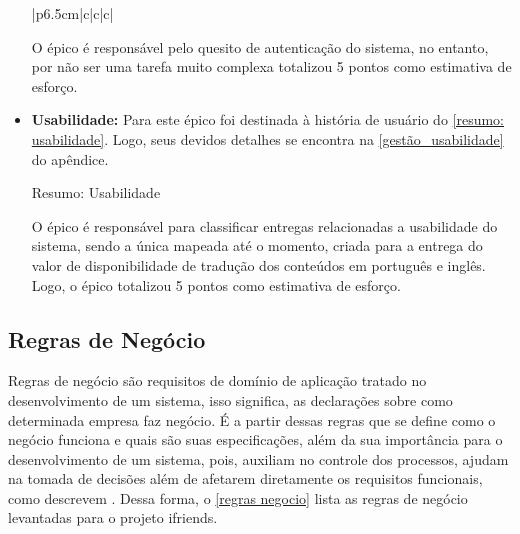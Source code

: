 \begin{itemize}
\begin{quadro}[htb]
{\begin{tabular}{|p{6.5cm}|c|c|c|}
\end{tabular}}
\end{quadro}
\FloatBarrier 

O épico é responsável pelo quesito de autenticação do sistema, no entanto, por não ser uma tarefa muito complexa totalizou 5 pontos como estimativa de esforço.

\item {\textbf{Usabilidade:}} Para este épico foi destinada à história de usuário do \autoref{resumo: usabilidade}. Logo, seus devidos detalhes se encontra na \autoref{gestão_usabilidade} do apêndice.

\def\arraystretch{2}
\begin{quadro}[htb]
\centering
\ABNTEXfontereduzida
\caption{Resumo: Usabilidade}
\label{resumo: usabilidade}
\end{quadro}
\FloatBarrier 

O épico é responsável para classificar entregas relacionadas a usabilidade do sistema, sendo a única mapeada até o momento, criada para a entrega do valor de disponibilidade de tradução dos conteúdos em português e inglês. Logo, o épico totalizou 5 pontos como estimativa de esforço.

\end{itemize}

\subsection{Regras de Negócio}
Regras de negócio são requisitos de domínio de aplicação tratado no desenvolvimento de um sistema, isso significa, as declarações sobre como determinada empresa faz negócio. É a partir dessas regras que se define como o negócio funciona e quais são suas especificações, além da sua importância para o desenvolvimento de um sistema, pois, auxiliam no controle dos processos, ajudam na tomada de decisões além de afetarem diretamente os requisitos funcionais, como descrevem . Dessa forma, o \autoref{regras negocio} lista as regras de negócio levantadas para o projeto \gls{ifriends}.

